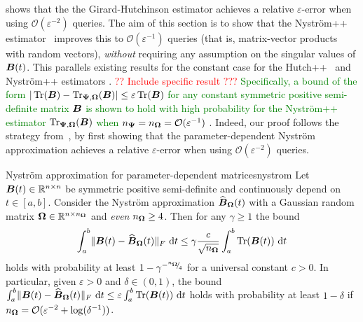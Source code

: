  shows that the the Girard-Hutchinson estimator achieves a relative $\varepsilon$-error when using $\mathcal{O}(\varepsilon^{-2})$ queries. The aim of this section is to show that the Nyström++ estimator~ improves this to $\mathcal{O}(\varepsilon^{-1})$ queries (that is, matrix-vector products with random vectors), \emph{without} requiring any assumption on the singular values of $\boldsymbol{B}(t)$. This parallels existing results for the constant case for the Hutch++~\cite[Theorem 3.1]{meyer-2021-hutch-optimal} and Nyström++ estimators \cite[Theorem 3.4]{persson-2022-improved-variants}. \textcolor{red}{?? Include specific result ???} \textcolor{green}{Specifically, a bound of the form $|\operatorname{Tr}(\boldsymbol{B}) - \operatorname{Tr}_{\boldsymbol{\Psi}, \boldsymbol{\Omega}}(\boldsymbol{B})| \leq \varepsilon \operatorname{Tr}(\boldsymbol{B})$ for any constant symmetric positive semi-definite matrix $\boldsymbol{B}$ is shown to hold with high probability for the Nyström++ estimator $\operatorname{Tr}_{\boldsymbol{\Psi}, \boldsymbol{\Omega}}(\boldsymbol{B})$  when $n_{\boldsymbol{\Psi}} = n_{\boldsymbol{\Omega}} = \mathcal{O}(\varepsilon^{-1})$ }. Indeed, our proof follows the strategy from~\cite{meyer-2021-hutch-optimal}, by first showing that the parameter-dependent Nyström approximation achieves a relative $\varepsilon$-error when using $\mathcal{O}(\varepsilon^{-2})$ queries.

\color{blue}

\begin{lemma}{Nyström approximation for parameter-dependent matrices}{nystrom}
    Let $\boldsymbol{B}(t) \in \mathbb{R}^{n \times n}$ be symmetric positive semi-definite and continuously depend on $t \in [a, b]$. Consider the Nyström approximation $\widehat{\boldsymbol{B}}_{\boldsymbol{\Omega}}(t)$ with a Gaussian random matrix $\boldsymbol{\Omega} \in \mathbb{R}^{n \times n_{\boldsymbol{\Omega}}}$ and \emph{even} $n_{\boldsymbol{\Omega}} \geq 4$.
    Then for any $\gamma \geq 1$ the bound
    \begin{equation}
        \int_{a}^{b} \lVert \boldsymbol{B}(t) - \widehat{\boldsymbol{B}}_{\boldsymbol{\Omega}}(t) \rVert _F~\mathrm{d}t \leq \gamma \frac{c}{\sqrt{n_{\boldsymbol{\Omega}}}} \int_{a}^{b} \operatorname{Tr}(\boldsymbol{B}(t))~\mathrm{d}t
        \label{qu:nystrompp-theorem-bound}
    \end{equation}
        holds with probability at least $1 - \gamma^{-{}^{n_{\boldsymbol{\Omega}}}{\mskip -5mu/\mskip -3mu}_{4}}$ for 
        a universal constant $c > 0$. In particular, given $\varepsilon > 0$ and $\delta \in (0, 1)$, the bound $\int_{a}^{b} \lVert \boldsymbol{B}(t) - \widehat{\boldsymbol{B}}_{\boldsymbol{\Omega}}(t) \rVert _F~\mathrm{d}t \leq \varepsilon \int_{a}^{b} \operatorname{Tr}(\boldsymbol{B}(t))~\mathrm{d}t$ holds with probability at least $1-\delta$ if $n_{\boldsymbol{\Omega}} = \mathcal{O}(\varepsilon^{-2} + \log(\delta^{-1}))$.
\end{lemma}

